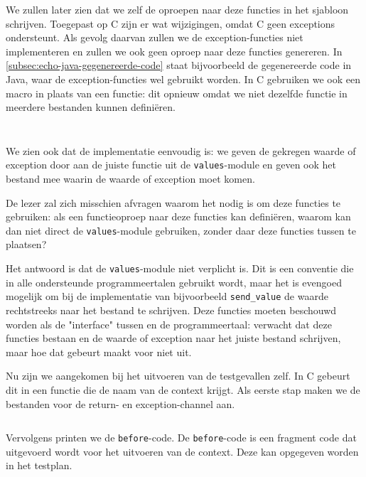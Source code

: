 We zullen later zien dat we zelf de oproepen naar deze functies in het sjabloon schrijven.
Toegepast op C zijn er wat wijzigingen, omdat C geen exceptions ondersteunt.
Als gevolg daarvan zullen we de exception-functies niet implementeren en zullen we ook geen oproep naar deze functies genereren.
In \cref{subsec:echo-java-gegenereerde-code} staat bijvoorbeeld de gegenereerde code in Java, waar de exception-functies wel gebruikt worden.
In C gebruiken we ook een macro in plaats van een functie: dit opnieuw omdat we niet dezelfde functie in meerdere bestanden kunnen definiëren.

\inputminted[firstline=25,lastline=27]{mako}{sources/c-context.mako}
\vspace{-1.7cm} %
\inputminted[firstline=29,lastline=30]{mako}{sources/c-context.mako}

We zien ook dat de implementatie eenvoudig is: we geven de gekregen waarde of exception door aan de juiste functie uit de \texttt{values}-module en geven ook het bestand mee waarin de waarde of exception moet komen.

De lezer zal zich misschien afvragen waarom het nodig is om deze functies te gebruiken: als \tested{} een functieoproep naar deze functies kan definiëren, waarom kan \tested{} dan niet direct de \texttt{values}-module gebruiken, zonder daar deze functies tussen te plaatsen?

Het antwoord is dat de \texttt{values}-module niet verplicht is.
Dit is een conventie die in alle ondersteunde programmeertalen gebruikt wordt, maar het is evengoed mogelijk om bij de implementatie van bijvoorbeeld \texttt{send\_value} de waarde rechtstreeks naar het bestand te schrijven.
Deze functies moeten beschouwd worden als de "interface" tussen \tested{} en de programmeertaal: \tested{} verwacht dat deze functies bestaan en de waarde of exception naar het juiste bestand schrijven, maar hoe dat gebeurt maakt voor \tested{} niet uit.

Nu zijn we aangekomen bij het uitvoeren van de testgevallen zelf.
In C gebeurt dit in een functie die de naam van de context krijgt.
Als eerste stap maken we de bestanden voor de return- en exception-channel aan.

\inputminted[firstline=33,lastline=36]{mako}{sources/c-context.mako}

Vervolgens printen we de \texttt{before}-code.
De \texttt{before}-code is een fragment code dat uitgevoerd wordt voor het uitvoeren van de context.
Deze kan opgegeven worden in het testplan.


